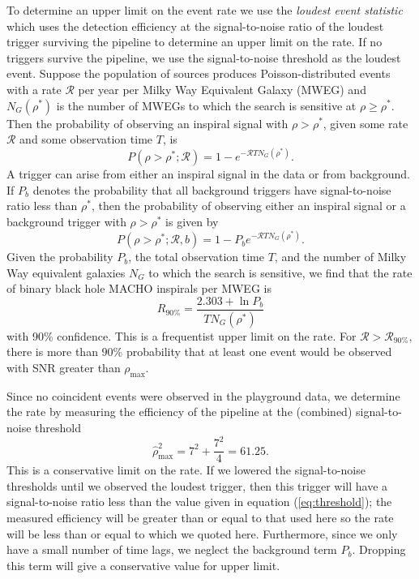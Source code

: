 To determine an upper limit on the event rate we use the \emph{loudest event
statistic}\cite{loudestGWDAW03} which uses the detection efficiency at the
signal-to-noise ratio of the loudest trigger surviving the pipeline to
determine an upper limit on the rate. If no triggers survive the pipeline, we
use the signal-to-noise threshold as the loudest event.  Suppose the
population of sources produces Poisson-distributed events with a rate
$\mathcal{R}$ per year per Milky Way Equivalent Galaxy (MWEG) and
$N_G(\rho^\ast)$ is the number of MWEGs to which the search is sensitive at
$\rho \geq \rho^\ast$.   Then the probability of observing an inspiral signal
with $\rho > \rho^\ast$, given some rate $\mathcal{R}$ and some observation
time $T$, is
\begin{equation}
P(\rho>\rho^\ast;{\mathcal{R}}) = 1 - e^{-{\mathcal{R}}T N_G(\rho^\ast)}.
\label{eq:foreground-poisson}
\end{equation}
A trigger can arise from either an inspiral signal in the data or from
background.   If $P_b$ denotes the probability that all background triggers
have signal-to-noise ratio less than $\rho^\ast$,  then the probability of observing either an
inspiral signal or a background trigger with $\rho > \rho^\ast$ is given by
\begin{equation}
P(\rho>\rho^\ast;{\mathcal{R}},b) = 1 - P_b e^{-{\mathcal{R}}TN_G(\rho^\ast)}.
\label{eq:joint-dist}
\end{equation}
Given the probability $P_b$, the total observation time $T$, and the number of
Milky Way equivalent galaxies $N_{{G}}$ to which the search is sensitive, we
find that the rate of binary black hole MACHO inspirals per MWEG is
\begin{equation}
  R_{90\%} = \frac{2.303+\ln P_b}{T N_{G}(\rho^\ast)}
\end{equation}
with 90\% confidence. This is a frequentist upper limit on the rate.
For ${\mathcal{R}}>{\mathcal{R}}_{90\%}$, there is more than $90\%$
probability that at least one event would be observed with SNR greater
than $\rho_{\text{max}}$. 

Since no coincident events were observed in the playground data, we determine
the rate by measuring the efficiency of the pipeline at the (combined)
signal-to-noise threshold
\begin{equation}
\hat{\rho}^2_\mathrm{max} =  7^2 + \frac{7^2}{4} = 61.25.
\label{eq:threshold}
\end{equation}
This is a conservative limit on the rate. If we lowered the
signal-to-noise thresholds until we observed the loudest trigger, then this
trigger will have a signal-to-noise ratio less than the value given in equation
(\ref{eq:threshold}); the measured efficiency will be greater than or equal to
that used here so the rate will be less than or equal to which we
quoted here. Furthermore, since we only have a small number of time lags, we
neglect the background term $P_b$. Dropping this term will give a conservative
value for upper limit\cite{loudestGWDAW03}.

